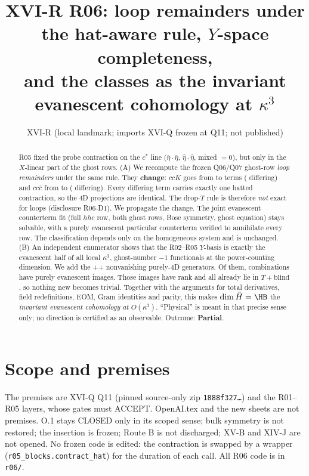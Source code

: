 \documentclass[11pt]{article}
\title{XVI-R R06: loop remainders under the hat-aware rule, $Y$-space completeness,\\
and the \HB{} classes as the invariant evanescent cohomology at $\kappa^3$}
\author{XVI-R (local landmark; imports XVI-Q frozen at Q11; not published)}
\date{}
\begin{document}
\maketitle
\begin{abstract}
R05 fixed the probe contraction on the $c^*$ line ($\bar\eta\cdot\bar\eta$, $\hat\eta\cdot\hat\eta$, mixed $=0$), but only
in the $X$-linear part of the ghost rows. (A) We recompute the frozen Q06/Q07 ghost-row \emph{loop remainders} under the
same rule. They \textbf{change}: $ccK$ goes from \LKo{} to \LKn{} terms (\LKd{} differing) and $cc\bar c$ from \LBo{} to
\LBn{} (\LBd{} differing). Every differing term carries exactly one hatted contraction, so the 4D projections are
identical. The drop-$T$ rule is therefore \emph{not} exact for loops (disclosure R06-D1). We propagate the change. The joint
evanescent counterterm fit (full $hhc$ row, both ghost rows, Bose symmetry, ghost equation) stays solvable, with a purely
evanescent particular counterterm verified to annihilate every row. The classification depends only on the homogeneous
system and is unchanged. (B) An independent enumerator shows that the R02--R05 $Y$-basis is exactly the evanescent half of
all local $\kappa^3$, ghost-number $-1$ functionals at the power-counting dimension. We add the \NF{}+\NGgen{}+\NKKc{}
nonvanishing purely-4D generators. Of them, \ZP{} combinations have purely evanescent images. Those images have rank
\ZR{} and all already lie in $T+\text{blind}$, so nothing new becomes trivial. Together with the arguments for total
derivatives, field redefinitions, EOM, Gram identities and parity, this makes $\dim\bar H=\HB$ the \emph{invariant
evanescent cohomology at $O(\kappa^3)$}. ``Physical'' is meant in that precise sense only; no direction is certified as an
observable. Outcome: \textbf{Partial}.
\end{abstract}

\section{Scope and premises}
The premises are XVI-Q Q11 (pinned source-only zip \texttt{1888f327\ldots}) and the R01--R05 layers, whose gates must
ACCEPT. OpenAI.tex and the new sheets are not premises. O.1 stays CLOSED only in its scoped sense; bulk symmetry is not
restored; the insertion is frozen; Route B is not discharged; XV-B and XIV-J are not opened. No frozen code is edited:
the contraction is swapped by a wrapper (\texttt{r05\_blocks.contract\_hat}) for the duration of each call. All R06 code
is in \texttt{r06/}.
\end{document}
